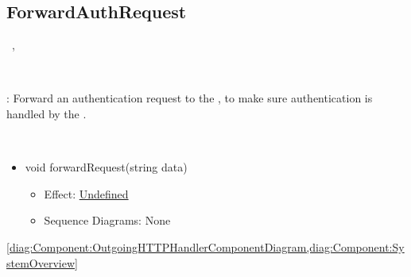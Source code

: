   \subsection{ForwardAuthRequest}\label{int:InterfacesForwardAuthRequest}
    \begin{description}
      \item[Provided by:] \iconcomponent{}~, \iconcomponent{}~
      \item[Required by:] \iconcomponent{}~ 
           \item[Description]: Forward an authentication request to the , to make sure authentication is handled by the .
      \item[Operations:] ~
    \begin{itemize}[noitemsep,nolistsep,leftmargin=-.25cm]
      \item \textsf{void forwardRequest(string data)}
        \begin{itemize}[noitemsep,nolistsep]
           \item Effect: {\colorbox{red!30}{\underline{Undefined}}} 
           \item Sequence Diagrams: None
        \end{itemize}
    \end{itemize}
      \item[Diagrams:] \cref{diag:Component:OutgoingHTTPHandlerComponentDiagram,diag:Component:SystemOverview}
    \end{description}

